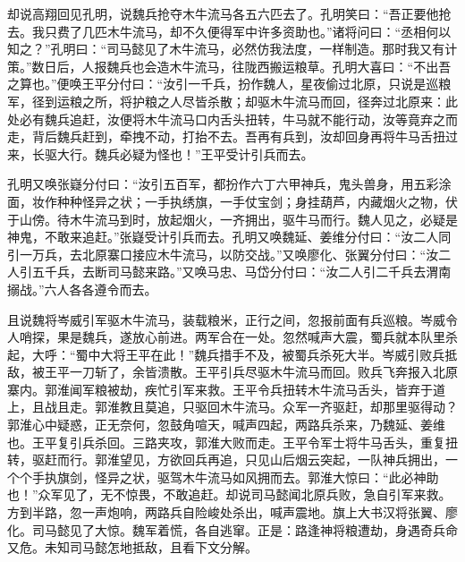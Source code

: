 却说高翔回见孔明，说魏兵抢夺木牛流马各五六匹去了。孔明笑曰：“吾正要他抢去。我只费了几匹木牛流马，却不久便得军中许多资助也。”诸将问曰：“丞相何以知之？”孔明曰：“司马懿见了木牛流马，必然仿我法度，一样制造。那时我又有计策。”数日后，人报魏兵也会造木牛流马，往陇西搬运粮草。孔明大喜曰：“不出吾之算也。”便唤王平分付曰：“汝引一千兵，扮作魏人，星夜偷过北原，只说是巡粮军，径到运粮之所，将护粮之人尽皆杀散；却驱木牛流马而回，径奔过北原来：此处必有魏兵追赶，汝便将木牛流马口内舌头扭转，牛马就不能行动，汝等竟弃之而走，背后魏兵赶到，牵拽不动，打抬不去。吾再有兵到，汝却回身再将牛马舌扭过来，长驱大行。魏兵必疑为怪也！”王平受计引兵而去。

孔明又唤张嶷分付曰：“汝引五百军，都扮作六丁六甲神兵，鬼头兽身，用五彩涂面，妆作种种怪异之状；一手执绣旗，一手仗宝剑；身挂葫芦，内藏烟火之物，伏于山傍。待木牛流马到时，放起烟火，一齐拥出，驱牛马而行。魏人见之，必疑是神鬼，不敢来追赶。”张嶷受计引兵而去。孔明又唤魏延、姜维分付曰：“汝二人同引一万兵，去北原寨口接应木牛流马，以防交战。”又唤廖化、张翼分付曰：“汝二人引五千兵，去断司马懿来路。”又唤马忠、马岱分付曰：“汝二人引二千兵去渭南搦战。”六人各各遵令而去。

且说魏将岑威引军驱木牛流马，装载粮米，正行之间，忽报前面有兵巡粮。岑威令人哨探，果是魏兵，遂放心前进。两军合在一处。忽然喊声大震，蜀兵就本队里杀起，大呼：“蜀中大将王平在此！”魏兵措手不及，被蜀兵杀死大半。岑威引败兵抵敌，被王平一刀斩了，余皆溃散。王平引兵尽驱木牛流马而回。败兵飞奔报入北原寨内。郭淮闻军粮被劫，疾忙引军来救。王平令兵扭转木牛流马舌头，皆弃于道上，且战且走。郭淮教且莫追，只驱回木牛流马。众军一齐驱赶，却那里驱得动？郭淮心中疑惑，正无奈何，忽鼓角喧天，喊声四起，两路兵杀来，乃魏延、姜维也。王平复引兵杀回。三路夹攻，郭淮大败而走。王平令军士将牛马舌头，重复扭转，驱赶而行。郭淮望见，方欲回兵再追，只见山后烟云突起，一队神兵拥出，一个个手执旗剑，怪异之状，驱驾木牛流马如风拥而去。郭淮大惊曰：“此必神助也！”众军见了，无不惊畏，不敢追赶。却说司马懿闻北原兵败，急自引军来救。方到半路，忽一声炮响，两路兵自险峻处杀出，喊声震地。旗上大书汉将张翼、廖化。司马懿见了大惊。魏军着慌，各自逃窜。正是：路逢神将粮遭劫，身遇奇兵命又危。未知司马懿怎地抵敌，且看下文分解。